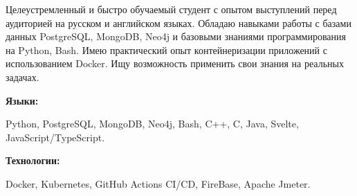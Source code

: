 \documentclass[9pt]{developercv} %
\begin{document}
\begin{minipage}[t]{0.46\textwidth}
	\vspace{-6pt}

	Целеустремленный и быстро обучаемый студент с опытом выступлений перед аудиторией на русском и английском языках. Обладаю навыками работы с базами данных PostgreSQL, MongoDB, Neo4j и базовыми знаниями программирования на Python, Bash. Имею практический опыт контейнеризации приложений с использованием Docker. Ищу возможность применить свои знания на реальных задачах.
\end{minipage}
\hfill %
\begin{minipage}[t]{0.465\textwidth}
    \vspace{-6pt}
    
    \begin{minipage}[t]{0.2\textwidth}
        \textbf{Языки:}
    \end{minipage}
    \hfill
    \begin{minipage}[t]{0.73\textwidth}
       Python, PostgreSQL,  MongoDB, Neo4j, Bash,   C++, C, Java,  Svelte, JavaScript/TypeScript.
    \end{minipage}
    \vspace{4mm}
    
    \begin{minipage}[t]{0.2\textwidth}
        \textbf{Технологии:}
    \end{minipage}
    \hfill
    \begin{minipage}[t]{0.73\textwidth}
       Docker, Kubernetes, GitHub Actions CI/CD, FireBase, Apache Jmeter.
    \end{minipage}
    
\end{minipage}
\end{document}
